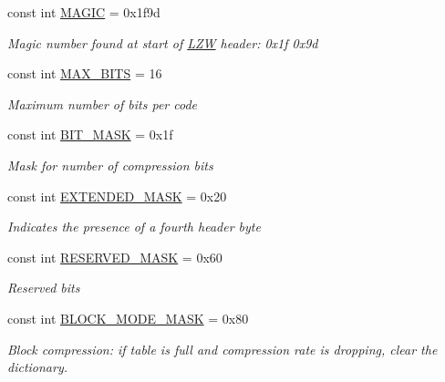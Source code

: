 \begin{DoxyCompactItemize}
\item 
const int \hyperlink{class_i_c_sharp_code_1_1_sharp_zip_lib_1_1_l_z_w_1_1_lzw_constants_abe7ef278e50302beee80843a64d45e0a}{M\+A\+G\+IC} = 0x1f9d
\begin{DoxyCompactList}\small\item\em Magic number found at start of \hyperlink{namespace_i_c_sharp_code_1_1_sharp_zip_lib_1_1_l_z_w}{L\+ZW} header\+: 0x1f 0x9d \end{DoxyCompactList}\item 
const int \hyperlink{class_i_c_sharp_code_1_1_sharp_zip_lib_1_1_l_z_w_1_1_lzw_constants_a9d7cc91ee03f1fb240643ca08b895a21}{M\+A\+X\+\_\+\+B\+I\+TS} = 16
\begin{DoxyCompactList}\small\item\em Maximum number of bits per code \end{DoxyCompactList}\item 
const int \hyperlink{class_i_c_sharp_code_1_1_sharp_zip_lib_1_1_l_z_w_1_1_lzw_constants_ad8be2c1fdee4bc91de1dcee3d014488e}{B\+I\+T\+\_\+\+M\+A\+SK} = 0x1f
\begin{DoxyCompactList}\small\item\em Mask for \textquotesingle{}number of compression bits\textquotesingle{} \end{DoxyCompactList}\item 
const int \hyperlink{class_i_c_sharp_code_1_1_sharp_zip_lib_1_1_l_z_w_1_1_lzw_constants_af0b477e22aab1c64b3383e9ebe9f185e}{E\+X\+T\+E\+N\+D\+E\+D\+\_\+\+M\+A\+SK} = 0x20
\begin{DoxyCompactList}\small\item\em Indicates the presence of a fourth header byte \end{DoxyCompactList}\item 
const int \hyperlink{class_i_c_sharp_code_1_1_sharp_zip_lib_1_1_l_z_w_1_1_lzw_constants_a395710ab7b84a7ab807cea2f8c8dfa33}{R\+E\+S\+E\+R\+V\+E\+D\+\_\+\+M\+A\+SK} = 0x60
\begin{DoxyCompactList}\small\item\em Reserved bits \end{DoxyCompactList}\item 
const int \hyperlink{class_i_c_sharp_code_1_1_sharp_zip_lib_1_1_l_z_w_1_1_lzw_constants_ac953e55a7d10c1e4bbee5f7703de1a4d}{B\+L\+O\+C\+K\+\_\+\+M\+O\+D\+E\+\_\+\+M\+A\+SK} = 0x80
\begin{DoxyCompactList}\small\item\em Block compression\+: if table is full and compression rate is dropping, clear the dictionary. \end{DoxyCompactList}\item 

\end{DoxyCompactItemize}
